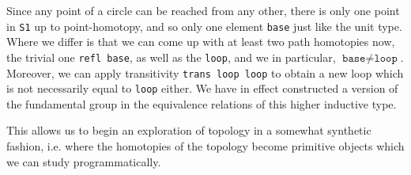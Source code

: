\documentclass[11pt]{article}
\begin{document}
Since any point of a circle can be reached from any other, there is only one point in \texttt{S1} up to point-homotopy, and so only one element \texttt{base} just like the unit type. Where we differ is that we can come up with at least two path homotopies now, the trivial one \texttt{refl base}, as well as the \texttt{loop}, and we in particular, $\texttt{base} \neq \texttt{loop}$. Moreover, we can apply transitivity \texttt{trans loop loop} to obtain a new loop which is not necessarily equal to \texttt{loop} either. We have in effect constructed a version of the fundamental group in the equivalence relations of this higher inductive type.

This allows us to begin an exploration of topology in a somewhat synthetic fashion, i.e. where the homotopies of the topology become primitive objects which we can study programmatically.
\end{document}
